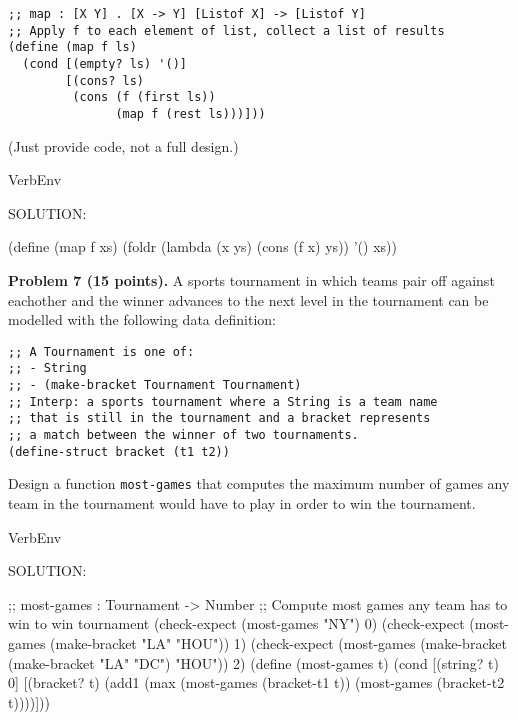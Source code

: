 \documentclass[12pt]{article}
\begin{document}
\begin{verbatim}
;; map : [X Y] . [X -> Y] [Listof X] -> [Listof Y]
;; Apply f to each element of list, collect a list of results
(define (map f ls)
  (cond [(empty? ls) '()]
        [(cons? ls)
         (cons (f (first ls))
               (map f (rest ls)))]))
\end{verbatim}

\noindent
(Just provide code, not a full design.)

\begin{SaveVerbatim}{VerbEnv}

SOLUTION:

(define (map f xs)
  (foldr (lambda (x ys) (cons (f x) ys)) '() xs))
\end{SaveVerbatim}



\newpage

\noindent
{\bf Problem 7 (15 points).}
%
A sports tournament in which teams pair off against eachother and
the winner advances to the next level in the tournament can be modelled
with the following data definition:

\begin{verbatim}
;; A Tournament is one of:
;; - String
;; - (make-bracket Tournament Tournament)
;; Interp: a sports tournament where a String is a team name
;; that is still in the tournament and a bracket represents
;; a match between the winner of two tournaments. 
(define-struct bracket (t1 t2))
\end{verbatim}

Design a function {\tt most-games} that computes the maximum number of
games any team in the tournament would have to play in order to win
the tournament.


\begin{SaveVerbatim}{VerbEnv}

SOLUTION:

;; most-games : Tournament -> Number
;; Compute most games any team has to win to win tournament
(check-expect (most-games "NY") 0)
(check-expect (most-games (make-bracket "LA" "HOU")) 1)
(check-expect (most-games (make-bracket (make-bracket "LA" "DC") "HOU")) 2)
(define (most-games t)
  (cond [(string? t) 0]
        [(bracket? t)
         (add1 (max (most-games (bracket-t1 t))
                    (most-games (bracket-t2 t))))]))
\end{SaveVerbatim}

\end{document}
